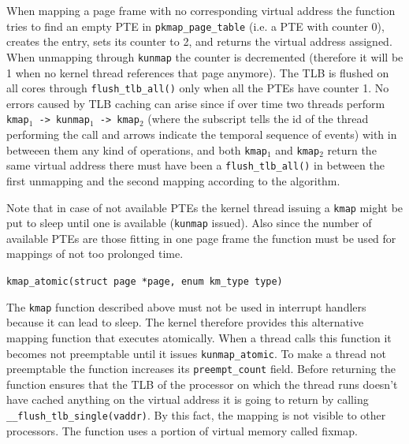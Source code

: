 \documentclass[twoside]{article}
\begin{document}
\begin{description}
        When mapping a page frame with no corresponding virtual address the
        function tries to find an empty PTE in \texttt{pkmap_page_table} (i.e. a
        PTE with counter 0), creates the entry, sets its counter to 2, 
        and returns the virtual address assigned. When unmapping through
        \texttt{kunmap} the counter is decremented (therefore it will be 1 when
        no kernel thread references that page anymore). The TLB is flushed on all
        cores through \texttt{flush_tlb_all()} only when all the PTEs have
        counter 1. No errors caused by TLB caching can arise since if over time
        two threads perform \texttt{kmap$_1$ -> kunmap$_1$ -> kmap$_2$} (where
        the subscript tells the id of the thread performing the call and arrows
        indicate the temporal sequence of events) with in betweeen them any
        kind of operations, and both \texttt{kmap$_1$} and \texttt{kmap$_2$}
        return the same virtual address there must have been a
        \texttt{flush_tlb_all()} in between the first unmapping and the second
        mapping according to the algorithm.

        Note that in case of not available PTEs the kernel thread issuing a
        \texttt{kmap} might be put to sleep until one is available
        (\texttt{kunmap} issued). Also
        since the number of available PTEs are those fitting in one page frame
        the function must be used for mappings of not too prolonged time.

\newpage

    \item \texttt{kmap_atomic(struct page *page, enum km_type type)}

        The \texttt{kmap} function described above must not be used in interrupt
        handlers because it can lead to sleep. The kernel therefore provides this
        alternative mapping function that executes atomically. When a thread
        calls this function it becomes not preemptable until it issues
        \texttt{kunmap_atomic}. To make a thread not preemptable the function
        increases its \texttt{preempt_count} field. Before returning the
        function ensures that the TLB of the processor on which the thread runs
        doesn't have cached anything on the virtual address it is going to
        return by calling \texttt{__flush_tlb_single(vaddr)}. By this fact, the
        mapping is not visible to other processors. The function uses a portion
        of virtual memory called fixmap.

\end{description}
\end{document}
